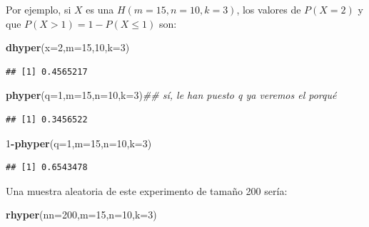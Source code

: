 \documentclass[]{book}
\newenvironment{Shaded}{\begin{snugshade}}{\end{snugshade}}
\newcommand{\CommentTok}[1]{\textcolor[rgb]{0.56,0.35,0.01}{\textit{#1}}}
\newcommand{\DataTypeTok}[1]{\textcolor[rgb]{0.13,0.29,0.53}{#1}}
\newcommand{\DecValTok}[1]{\textcolor[rgb]{0.00,0.00,0.81}{#1}}
\newcommand{\KeywordTok}[1]{\textcolor[rgb]{0.13,0.29,0.53}{\textbf{#1}}}
\newcommand{\NormalTok}[1]{#1}
\newcommand{\OperatorTok}[1]{\textcolor[rgb]{0.81,0.36,0.00}{\textbf{#1}}}
\begin{document}
Por ejemplo, si \(X\) es una \(H(m=15,n=10,k=3)\), los valores de \(P(X=2)\) y que \(P(X>1)=1-P(X\leq 1)\) son:

\begin{Shaded}
\begin{Highlighting}[]
\KeywordTok{dhyper}\NormalTok{(}\DataTypeTok{x=}\DecValTok{2}\NormalTok{,}\DataTypeTok{m=}\DecValTok{15}\NormalTok{,}\DecValTok{10}\NormalTok{,}\DataTypeTok{k=}\DecValTok{3}\NormalTok{)}
\end{Highlighting}
\end{Shaded}

\begin{verbatim}
## [1] 0.4565217
\end{verbatim}

\begin{Shaded}
\begin{Highlighting}[]
\KeywordTok{phyper}\NormalTok{(}\DataTypeTok{q=}\DecValTok{1}\NormalTok{,}\DataTypeTok{m=}\DecValTok{15}\NormalTok{,}\DataTypeTok{n=}\DecValTok{10}\NormalTok{,}\DataTypeTok{k=}\DecValTok{3}\NormalTok{)}\CommentTok{## sí, le han puesto q ya veremos el porqué}
\end{Highlighting}
\end{Shaded}

\begin{verbatim}
## [1] 0.3456522
\end{verbatim}

\begin{Shaded}
\begin{Highlighting}[]
\DecValTok{1}\OperatorTok{-}\KeywordTok{phyper}\NormalTok{(}\DataTypeTok{q=}\DecValTok{1}\NormalTok{,}\DataTypeTok{m=}\DecValTok{15}\NormalTok{,}\DataTypeTok{n=}\DecValTok{10}\NormalTok{,}\DataTypeTok{k=}\DecValTok{3}\NormalTok{)}
\end{Highlighting}
\end{Shaded}

\begin{verbatim}
## [1] 0.6543478
\end{verbatim}

Una muestra aleatoria de este experimento de tamaño 200 sería:

\begin{Shaded}
\begin{Highlighting}[]
\KeywordTok{rhyper}\NormalTok{(}\DataTypeTok{nn=}\DecValTok{200}\NormalTok{,}\DataTypeTok{m=}\DecValTok{15}\NormalTok{,}\DataTypeTok{n=}\DecValTok{10}\NormalTok{,}\DataTypeTok{k=}\DecValTok{3}\NormalTok{)}
\end{Highlighting}
\end{Shaded}
\end{document}
